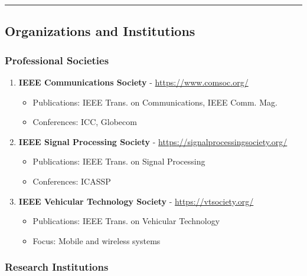 \begin{center}\rule{0.5\linewidth}{0.5pt}\end{center}

\subsection{\texorpdfstring{ Organizations and
Institutions}{ Organizations and Institutions}}\label{organizations-and-institutions}

\subsubsection{Professional Societies}\label{professional-societies}

\begin{enumerate}
\def\labelenumi{\arabic{enumi}.}
\setcounter{enumi}{56}
\tightlist
\item
  \textbf{IEEE Communications Society} - \url{https://www.comsoc.org/}

  \begin{itemize}
  \tightlist
  \item
    Publications: IEEE Trans. on Communications, IEEE Comm. Mag.
  \item
    Conferences: ICC, Globecom
  \end{itemize}
\item
  \textbf{IEEE Signal Processing Society} - \url{https://signalprocessingsociety.org/}

  \begin{itemize}
  \tightlist
  \item
    Publications: IEEE Trans. on Signal Processing
  \item
    Conferences: ICASSP
  \end{itemize}
\item
  \textbf{IEEE Vehicular Technology Society} - \url{https://vtsociety.org/}

  \begin{itemize}
  \tightlist
  \item
    Publications: IEEE Trans. on Vehicular Technology
  \item
    Focus: Mobile and wireless systems
  \end{itemize}
\end{enumerate}

\subsubsection{Research Institutions}\label{research-institutions}

